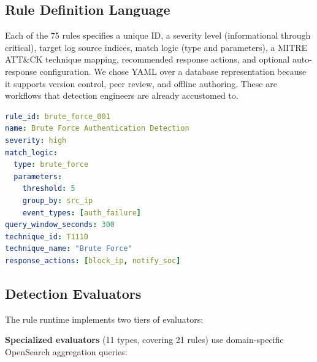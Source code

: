 \documentclass[conference,10pt]{IEEEtran}
\begin{document}
\subsection{Rule Definition Language}

Each of the 75 rules specifies a unique ID, a severity level (informational through critical), target log source indices, match logic (type and parameters), a MITRE ATT\&CK technique mapping, recommended response actions, and optional auto-response configuration. We chose YAML over a database representation because it supports version control, peer review, and offline authoring. These are workflows that detection engineers are already accustomed to.

\begin{lstlisting}[language=yaml,caption={Example: brute force detection rule},label={lst:rule}]
rule_id: brute_force_001
name: Brute Force Authentication Detection
severity: high
match_logic:
  type: brute_force
  parameters:
    threshold: 5
    group_by: src_ip
    event_types: [auth_failure]
query_window_seconds: 300
technique_id: T1110
technique_name: "Brute Force"
response_actions: [block_ip, notify_soc]
\end{lstlisting}

\subsection{Detection Evaluators}

The rule runtime implements two tiers of evaluators:

\textbf{Specialized evaluators} (11 types, covering 21 rules) use domain-specific OpenSearch aggregation queries:
\end{document}

